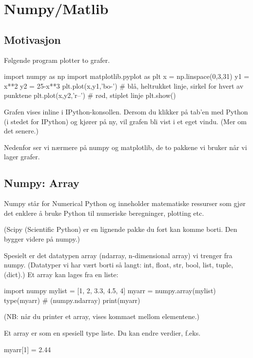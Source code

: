 \chapter{Numpy/Matlib}

\section{Motivasjon}

Følgende program plotter to grafer.

\begin{usncodebox}
import numpy as np
import matplotlib.pyplot as plt   
x = np.linspace(0,3,31)
y1 = x**2
y2 = 25-x**3
plt.plot(x,y1,'bo-')   # blå, heltrukket linje, sirkel for hvert av punktene  
plt.plot(x,y2,'r--')   # rød, stiplet linje
plt.show()
\end{usncodebox}

Grafen vises inline i IPython-konsollen. Dersom du klikker på tab'en med Python (i stedet for IPython) og kjører på ny, vil grafen bli vist i et eget vindu. (Mer om det senere.) 

Nedenfor ser vi nærmere på numpy og matplotlib, de to pakkene vi bruker når vi lager grafer. 

\section{Numpy: Array}

Numpy står for Numerical Python og inneholder matematiske ressurser som gjør det enklere å bruke Python til numeriske beregninger, plotting etc. 

(Scipy (Scientific Python) er en lignende pakke du fort kan komme borti. Den bygger videre på numpy.)

Spesielt er det datatypen array (ndarray, n-dimensional array) vi trenger fra numpy. (Datatyper vi har vært borti så langt: int, float, str, bool, list, tuple, (dict).) Et array kan lages fra en liste:

\begin{usncodebox}
import numpy
mylist = [1, 2, 3.3, 4.5, 4] 
myarr = numpy.array(mylist) 
type(myarr)    # (numpy.ndarray)
print(myarr)
\end{usncodebox}

(NB: når du printer et array, vises kommaet mellom elementene.)  

Et array er som en spesiell type liste. Du kan endre verdier, f.eks.
\begin{usncodebox}
myarr[1] = 2.44
\end{usncodebox}

